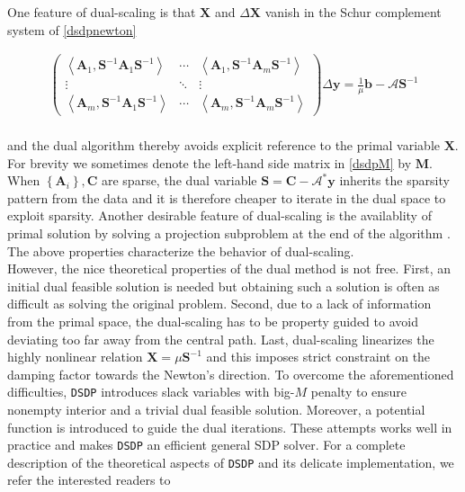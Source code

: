 One feature of dual-scaling is that $\mathbf{X}$ and $\Delta \mathbf{X}$
vanish in the Schur complement system of \eqref{dsdpnewton}

\begin{eqnarray} \label{dsdpM}
	\left(\begin{array}{ccc}
     \left\langle \mathbf{A}_1, \mathbf{S}^{- 1} \mathbf{A}_1 \mathbf{S}^{- 1} \right\rangle & \cdots &
     \left\langle \mathbf{A}_1, \mathbf{S}^{- 1} \mathbf{A}_m \mathbf{S}^{- 1} \right\rangle\\
     \vdots & \ddots & \vdots\\
     \left\langle \mathbf{A}_m, \mathbf{S}^{- 1} \mathbf{A}_1 \mathbf{S}^{- 1} \right\rangle & \cdots &
     \left\langle \mathbf{A}_m, \mathbf{S}^{- 1} \mathbf{A}_m \mathbf{S}^{- 1} \right\rangle
   \end{array}\right) \Delta \mathbf{y} = \frac{1}{\mu} \mathbf{b} - \mathcal{A} \mathbf{S}^{- 1}
\end{eqnarray}\\
and the dual algorithm thereby avoids explicit reference to the primal
variable $\mathbf{X}$. For brevity we sometimes denote the left-hand side matrix in \eqref{dsdpM} by $\mathbf{M}$.
When $\left\{ \mathbf{A}_i \right\}, \mathbf{C}$ are sparse, the dual variable $\mathbf{S} = \mathbf{C}
-\mathcal{A}^{\ast} \mathbf{y}$ inherits the sparsity pattern from the data and it is
therefore cheaper to iterate in the dual space to exploit sparsity.
Another desirable feature of dual-scaling is the availablity of primal
solution by solving a projection subproblem at the end of the algorithm \cite{benson2008algorithm}. The
above properties characterize the behavior of dual-scaling.\\

However, the nice theoretical properties of the dual method is not free. 
First, an initial dual feasible solution is needed but obtaining such a
solution is often as difficult as solving the original problem. Second, due to
a lack of information from the primal space, the dual-scaling has to be
property guided to avoid deviating too far away from the central path. Last,
dual-scaling linearizes the highly nonlinear relation $\mathbf{X} = \mu \mathbf{S}^{- 1}$ and
this imposes strict constraint on the damping factor towards the Newton's
direction. To overcome the aforementioned difficulties, {{\texttt{DSDP}}}
introduces slack variables with big-$M$ penalty to ensure nonempty interior
and a trivial dual feasible solution. Moreover, a potential function is introduced 
to guide the dual iterations. These attempts works
well in practice and makes {{\texttt{DSDP}}} an efficient general SDP solver.
For a complete description of the theoretical aspects of {{\texttt{DSDP}}} and
its delicate implementation, we refer the interested readers to
{\cite{benson2000solving, benson2008algorithm}}\\


